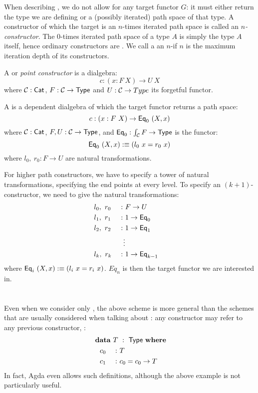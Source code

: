\documentclass[a4paper,10pt]{report}
\begin{document}
When describing \hits, we do not allow for any target functor $G$: it
must either return the type we are defining or a (possibly iterated)
path space of that type. A constructor of which the target is an
$n$-times iterated path space is called an \emph{$n$-constructor}. The
$0$-times iterated path space of a type $A$ is simply the type $A$
itself, hence ordinary constructors are \zeroconstructors. We call a
\hit an $n$-\hit if $n$ is the maximum iteration depth of its
constructors.

A \emph{\zeroconstructor} or \emph{point constructor} is a dialgebra:
$$
c : (x : F\ X) \to U\ X
$$
where $\mathcal{C} : \mathsf{Cat}$, $F : \mathcal{C} \to \mathsf{Type}$ and $U : \mathcal{C} \to Type$ its forgetful
functor.

A \emph{\oneconstructor} is a dependent dialgebra of which the target
functor returns a path space:
$$
  c : (x : F\ X) \to \mathsf{Eq}_0\ (X, x)
$$
where $\mathcal{C} : \mathsf{Cat}$, $F, U : \mathcal{C} \to \mathsf{Type}$, and $\mathsf{Eq}_0 : \int_{\mathcal{C}} F \to
\mathsf{Type}$ is the functor:
$$
  \mathsf{Eq}_0\ (X , x) :\equiv (l_0\ x = r_0\ x)
$$
where $l_0,\ r_0 : F \to U$ are natural transformations.

For higher path constructors, we have to specify a tower of natural
transformations, specifying the end points at every level. To specify
an $(k+1)$-constructor, we need to give the natural transformations:
%
\begin{alignat*}{5}
  &l_0,\ r_0  &\ :\ &F \to U& \\
  &l_1,\ r_1  &\ : \ &1 \to \mathsf{Eq}_0& \\
  &l_2,\ r_2  &\ : \ &1 \to \mathsf{Eq}_1& \\
  &           &\vdots&& \\
  &l_k,\ r_k  &\ : \ &1 \to \mathsf{Eq}_{k-1}&
\end{alignat*}
%
where $\mathsf{Eq}_i\ (X, x) :\equiv (l_i\ x = r_i\ x)$. $Eq_n$ is then the target
functor we are interested in.

\section{}
\label{sec:zerohits}

Even when we consider only \zeroconstructors, the above scheme is more
general than the schemes that are usually considered when talking
about \oits: any constructor may refer to any previous
constructor, \eg:
%
\begin{alignat*}{5}
  &\rlap{$\data\ T\ :\ \Type\ \where$} \\
  &\ \ c_0 &\ :\ &T&\\
  &\ \ c_1 &\ :\ &c_0 = c_0 \to T&
\end{alignat*}
%
In fact, Agda even allows such definitions, although the above example
is not particularly useful.
\end{document}
